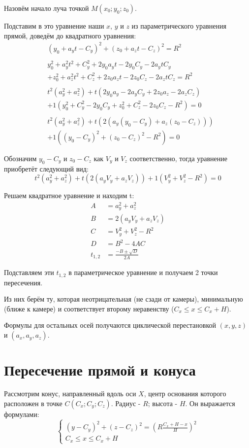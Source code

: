 \documentclass{article}
\begin{document}
	Назовём начало луча точкой $M(x_0;y_0;z_0)$.
	
	Подставим в это уравнение наши $x$, $y$ и $z$ из параметрического уравнения
	прямой, доведём до квадратного уравнения:
	\begin{equation}
		\begin{split}
			&(y_0+a_yt-C_y)^2+(z_0+a_zt-C_z)^2=R^2\\\\
			&y_0^2+a_y^2t^2+C_y^2+2y_0a_yt-2y_0C_y-2a_ytC_y\\
			&+z_0^2+a_z^2t^2+C_z^2+2z_0a_zt-2z_0C_z-2a_ztC_z=R^2\\\\
			&t^2(a_y^2+a_z^2)+t(2y_0a_y-2a_yC_y+2z_0a_z-2a_zC_z)\\
			&+1(y_0^2+C_y^2-2y_0C_y+z_0^2+C_z^2-2z_0C_z-R^2)=0\\\\
			&t^2(a_y^2+a_z^2)+t(2(a_y(y_0-C_y)+a_z(z_0-C_z)))\\
			&+1((y_0-C_y)^2+(z_0-C_z)^2-R^2)=0
		\end{split}
	\end{equation}
	
	Обозначим $y_0-C_y$ и $z_0-C_z$ как $V_y$ и $V_z$ соответственно, тогда
	уравнение приобретёт следующий вид:
	\begin{equation}
		t^2(a_y^2+a_z^2)+t(2(a_yV_y+a_zV_z))+1(V_y^2+V_z^2-R^2)=0
	\end{equation}
	
	Решаем квадратное уравнение и находим t:
	\begin{equation}
		\begin{split}
			A&=a_y^2+a_z^2\\
			B&=2(a_yV_y+a_zV_z)\\
			C&=V_y^2+V_z^2-R^2\\
			D&=B^2-4AC\\
			t_{1,2}&=\frac{-B\pm\sqrt{D}}{2A}
		\end{split}
	\end{equation}
	
	Подставляем эти $t_{1,2}$ в параметрическое уравнение и получаем 2 точки
	пересечения.
	
	Из них берём ту, которая неотрицательная (не сзади от камеры), минимальную
	(ближе к камере) и соответствует второму неравенству ($C_x\leq{}x\leq{}C_x+H$).
	
	Формулы для остальных осей получаются циклической перестановкой $(x,y,z)$ и
	$(a_x,a_y,a_z)$.
	\newpage
	\section{Пересечение прямой и конуса}
	Рассмотрим конус, направленный вдоль оси $X$, центр основания которого
	расположен в точке $C(C_x;C_y;C_z)$. Радиус - $R$; высота - $H$. Он выражается
	формулами:
	\begin{equation}
		\begin{cases}
			(y-C_y)^2+(z-C_z)^2=(R\frac{C_x+H-x}{H})^2\\
			C_x\leq{}x\leq{}C_x+H
		\end{cases}
	\end{equation}
	
\end{document}
